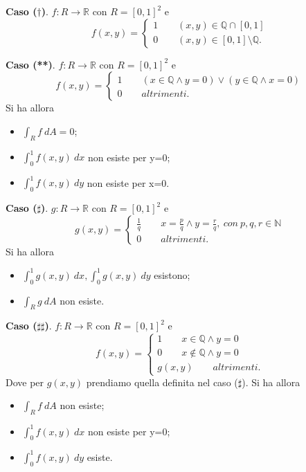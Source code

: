 \documentclass[10pt]{article}
\theoremstyle{plain}
\theoremstyle{definition}
\begin{document}
\textbf{Caso ($\dagger$)}.
$f:R\to\mathbb{R}$ con $R=[0,1]^2$ e
\begin{equation*}
  f(x,y)=
   \begin{cases}
   1\qquad (x ,y)\in \mathbb{Q} \cap [0,1]\\
   0\qquad (x ,y)\in [0,1]\setminus \mathbb{Q}.
   \end{cases}
\end{equation*}
\bigskip
\bigskip

\textbf{Caso (**)}.
$f:R\to\mathbb{R}$ con $R=[0,1]^2$ e
\begin{equation*}
  f(x,y)=
   \begin{cases}
   1\qquad (x \in \mathbb{Q} \wedge y=0)\vee (y \in \mathbb{Q} \wedge x=0)\\
   0\qquad altrimenti.
   \end{cases}
\end{equation*}
Si ha allora \begin{itemize}
    \item $ \int_R f\ dA = 0 $;
    \item $ \int_0^1 f(x,y)\ dx$  non esiste per y=0;
    \item $ \int_0^1 f(x,y)\ dy$  non esiste per x=0.
\end{itemize}
\bigskip
\bigskip

\textbf{Caso ($\sharp$)}.
$g:R\to\mathbb{R}$ con $R=[0,1]^2$ e
\begin{equation*}
  g(x,y)=
   \begin{cases}
   \frac{1}{q}\qquad x=\frac{p}{q} \wedge y=\frac{r}{q},\ con\ p,q,r \in \mathbb{N}\\
   0\qquad altrimenti.
   \end{cases}
\end{equation*}
Si ha allora \begin{itemize}
    \item $ \int_0^1 g(x,y)\ dx, \int_0^1 g(x,y)\ dy$  esistono;
    \item $ \int_R g\ dA$  non esiste.
\end{itemize}
\bigskip
\bigskip

\textbf{Caso ($\sharp \sharp$)}.
$f:R\to\mathbb{R}$ con $R=[0,1]^2$ e
\begin{equation*}
  f(x,y)=
   \begin{cases}
   1\qquad x \in \mathbb{Q} \wedge y=0\\
   0\qquad x \notin \mathbb{Q} \wedge y=0\\
   g(x,y)\qquad altrimenti.
   \end{cases}
\end{equation*}
Dove per $g(x,y)$ prendiamo quella definita nel caso ($\sharp$).
Si ha allora 
\begin{itemize}
    \item $ \int_R f\ dA$ non esiste;
    \item $ \int_0^1 f(x,y)\ dx$  non esiste per y=0;
    \item $ \int_0^1 f(x,y)\ dy$  esiste.
\end{itemize}
\end{document}
